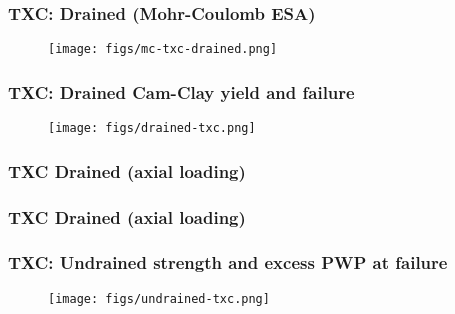 \documentclass[notes]{beamer}
\begin{document}
\begin{frame}
\frametitle{TXC: Drained (Mohr-Coulomb ESA)}
\begin{figure}
	\texttt{[image: figs/mc-txc-drained.png]}
\end{figure}
\end{frame}

\begin{frame}
\frametitle{TXC: Drained Cam-Clay yield and failure}
\begin{figure}
	\texttt{[image: figs/drained-txc.png]}
\end{figure}
\end{frame}

\begin{frame}
\frametitle{TXC Drained (axial loading)}
\end{frame}

\begin{frame}
\frametitle{TXC Drained (axial loading)}
\end{frame}

\begin{frame}
\frametitle{TXC: Undrained strength and excess PWP at failure}
\begin{figure}
	\texttt{[image: figs/undrained-txc.png]}
\end{figure}
\end{frame}
\end{document}
